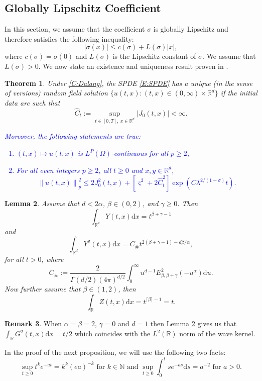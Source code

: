 \documentclass[a4paper,11pt]{article}
\numberwithin{equation}{section}
\theoremstyle{plain}
\newtheorem{theorem}{Theorem}[section]
\newtheorem{lemma}[theorem]{Lemma}
\theoremstyle{definition}
\newtheorem{remark}[theorem]{Remark}
\newcommand{\ud}{\ensuremath{\mathrm{d} }}
\newcommand{\Norm}[1]{\left\|  #1   \right\|}
\newcommand{\R}{\mathbb{R}}
\numberwithin{NQ}{section}
\numberwithin{LQ}{section}
\numberwithin{ZQ}{section}
\begin{document}
\subsection{Globally Lipschitz Coefficient}
In this section, we assume that the coefficient $\sigma$ is globally Lipschitz and therefore satisfies the following inequality:
	\[
		|\sigma(x)| \le c(\sigma) + L(\sigma)|x|,
	\] 
where $c(\sigma) = \sigma(0)$ and $L(\sigma)$ is the Lipschitz constant of $\sigma$. We assume that $L(\sigma)>0$. We now state an existence and uniqueness result proven in \cite{CHN19}.

	\begin{theorem}
	\label{T:SolveabilityGenLip}
Under \eqref{C:Dalang}, the SPDE \eqref{E:SPDE} has a unique (in the sense of versions) random field solution $\{u(t,x) : (t,x) \in (0,\infty) \times \R^d \}$ if the initial data are such that 
	\begin{equation}
		\hat{C}_t := \sup_{t\in[0,T],\; x\in \R^d} |J_0(t,x)| < \infty.
	\end{equation}	
\textcolor{blue}{Moreover, the following statements are true:
	\begin{enumerate}
		\item $(t,x) \mapsto u(t,x)$ is $L^P(\Omega)$-continuous for all $p \ge 2$,
		\item For all even integers $p \ge 2$, all $t \ge 0$ and $x,y\in\R^d$,
			\begin{equation}
				\Norm{u(t,x)}_p^2 \le 2J_0^2(t,x) + \left[ \bar{\varsigma}^2 + 2 \hat{C}_t^2 \right]\exp(C \lambda^{2/(1-\sigma)}t).
			\end{equation}
\end{enumerate}}
	
\end{theorem}
	\begin{lemma}{\normalfont \cite[Theorem 4.1 and Lemma 5.5]{CHN19}}
	\label{L:1and2normYZ}
Assume that $d < 2\alpha$, $\beta \in (0,2)$, and $\gamma \ge 0$. Then 
	\[
		\int_{\R^d} Y(t,x) \ud x = t^{\beta+\gamma -1 }
	\]
and
	\[
		\int_{\R^d} Y^2(t,x) \ud x = C_{\#} t^{2(\beta+\gamma-1)-d\beta/\alpha},
	\]
for all $t > 0$, where 
	\[
		C_{\#} := \frac{2}{\Gamma(d/2)(4 \pi )^{d/2}} \int_0^\infty u^{d-1}E^2_{\beta,\beta + \gamma}(-u^\alpha) \ud u.
	\]
Now further assume that $\beta \in (1,2)$, then 
	\[
		\int_{\R} Z(t,x) \ud x= t^{\lceil \beta \rceil -1} = t. 
	\]
	\end{lemma}
	\begin{remark}
When $\alpha = \beta = 2$,  $\gamma = 0$ and $d=1$ then Lemma \ref{L:1and2normYZ} gives us that $\int_{\R} G^2(t,x) \ud x = t/2$ which coincides with the $L^2(\R)$ norm of the wave kernel. 
	\end{remark}
In the proof of the next proposition, we will use the following two facts:
	\begin{equation}
	\label{E:SUPidentities}
		\sup_{t\ge0} t^ke^{-at} = k^k(ea)^{-k} \text{ for }k \in \mathbb{N} \text{ and } \sup_{t \ge 0} \int_0^t s e^{-as} \ud s = a^{-2} \text{ for } a>0.
	\end{equation}
	
\end{document}

